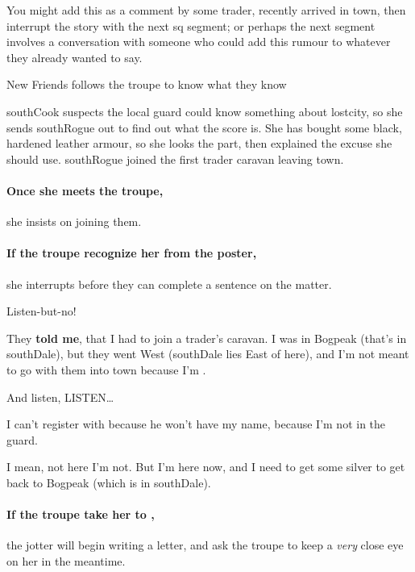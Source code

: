 You might add this as a comment by some trader, recently arrived in town, then interrupt the story with the next \gls{sq} \gls{segment}; or perhaps the next \gls{segment} involves a conversation with someone who could add this rumour to whatever they already wanted to say.

{New Friends}%
{ follows the troupe to know what they know}%

\Gls{southCook} suspects the local \gls{guard} could know something about \gls{lostcity}, so she sends \gls{southRogue} out to find out what the score is.
She has bought  some black, hardened leather armour, so she looks the part, then explained the excuse she should use.
\Gls{southRogue} joined the first trader caravan leaving \gls{town}.

\paragraph{Once she meets the troupe,}
she insists on joining them.

\paragraph{If the troupe recognize her from the poster,}
she interrupts before they can complete a sentence on the matter.

\begin{exampletext}
  Listen-but-no!
  
  They \textbf {told me}, that I had to join a trader's caravan.
  I was in Bogpeak (that's in \gls{southDale}), but they went West (\gls{southDale} lies East of here), and I'm not meant to go with them into \gls{town} because I'm .
  
  And listen, LISTEN\ldots

  I can't register with  because he won't have my name, because I'm not in the \gls{guard}.

  I mean, not here I'm not.
  But I'm here now, and I need to get some silver to get back to Bogpeak (which is in \gls{southDale}).
\end{exampletext}

\paragraph{If the troupe take her to ,}
the \gls{jotter} will begin writing a letter, and ask the troupe to keep a \textit{very} close eye on her in the meantime.

